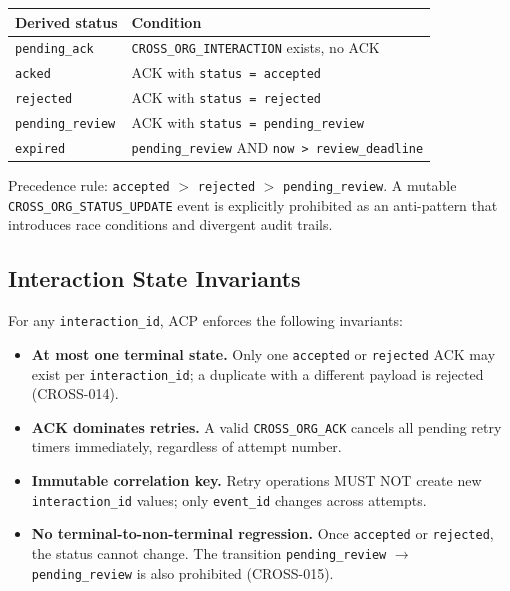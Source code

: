 \documentclass[11pt]{article}
\theoremstyle{definition}
\begin{document}
\begin{center}
\begin{tabular}{@{}ll@{}}
\toprule
\textbf{Derived status} & \textbf{Condition} \\
\midrule
\texttt{pending\_ack} & \texttt{CROSS\_ORG\_INTERACTION} exists, no ACK \\
\texttt{acked} & ACK with \texttt{status = accepted} \\
\texttt{rejected} & ACK with \texttt{status = rejected} \\
\texttt{pending\_review} & ACK with \texttt{status = pending\_review} \\
\texttt{expired} & \texttt{pending\_review} AND \texttt{now > review\_deadline} \\
\bottomrule
\end{tabular}
\end{center}

Precedence rule: \texttt{accepted} $>$ \texttt{rejected} $>$ \texttt{pending\_review}.
A mutable \texttt{CROSS\_ORG\_STATUS\_UPDATE} event is explicitly prohibited
as an anti-pattern that introduces race conditions and divergent audit trails.

\subsection{Interaction State Invariants}

For any \texttt{interaction\_id}, ACP enforces the following invariants:

\begin{itemize}[noitemsep]
  \item \textbf{At most one terminal state.}
        Only one \texttt{accepted} or \texttt{rejected} ACK may exist per \texttt{interaction\_id};
        a duplicate with a different payload is rejected (CROSS-014).
  \item \textbf{ACK dominates retries.}
        A valid \texttt{CROSS\_ORG\_ACK} cancels all pending retry timers immediately,
        regardless of attempt number.
  \item \textbf{Immutable correlation key.}
        Retry operations MUST NOT create new \texttt{interaction\_id} values;
        only \texttt{event\_id} changes across attempts.
  \item \textbf{No terminal-to-non-terminal regression.}
        Once \texttt{accepted} or \texttt{rejected}, the status cannot change.
        The transition \texttt{pending\_review} $\to$ \texttt{pending\_review} is also prohibited (CROSS-015).
\end{itemize}
\end{document}

